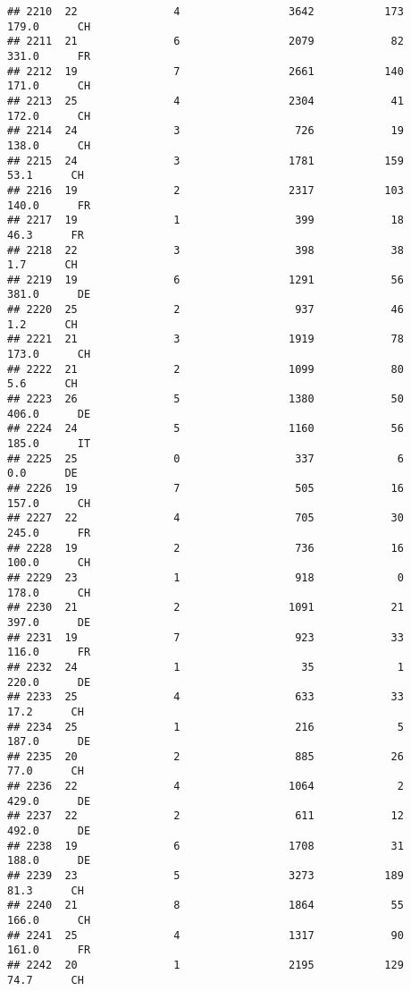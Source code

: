 \documentclass[
]{article}
\begin{document}
\begin{verbatim}
## 2210  22               4                 3642           173    179.0      CH
## 2211  21               6                 2079            82    331.0      FR
## 2212  19               7                 2661           140    171.0      CH
## 2213  25               4                 2304            41    172.0      CH
## 2214  24               3                  726            19    138.0      CH
## 2215  24               3                 1781           159     53.1      CH
## 2216  19               2                 2317           103    140.0      FR
## 2217  19               1                  399            18     46.3      FR
## 2218  22               3                  398            38      1.7      CH
## 2219  19               6                 1291            56    381.0      DE
## 2220  25               2                  937            46      1.2      CH
## 2221  21               3                 1919            78    173.0      CH
## 2222  21               2                 1099            80      5.6      CH
## 2223  26               5                 1380            50    406.0      DE
## 2224  24               5                 1160            56    185.0      IT
## 2225  25               0                  337             6      0.0      DE
## 2226  19               7                  505            16    157.0      CH
## 2227  22               4                  705            30    245.0      FR
## 2228  19               2                  736            16    100.0      CH
## 2229  23               1                  918             0    178.0      CH
## 2230  21               2                 1091            21    397.0      DE
## 2231  19               7                  923            33    116.0      FR
## 2232  24               1                   35             1    220.0      DE
## 2233  25               4                  633            33     17.2      CH
## 2234  25               1                  216             5    187.0      DE
## 2235  20               2                  885            26     77.0      CH
## 2236  22               4                 1064             2    429.0      DE
## 2237  22               2                  611            12    492.0      DE
## 2238  19               6                 1708            31    188.0      DE
## 2239  23               5                 3273           189     81.3      CH
## 2240  21               8                 1864            55    166.0      CH
## 2241  25               4                 1317            90    161.0      FR
## 2242  20               1                 2195           129     74.7      CH

\end{verbatim}
\end{document}
